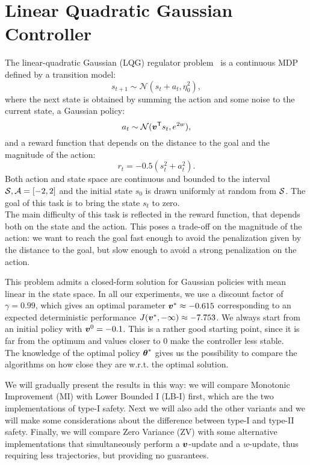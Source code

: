 \section{Linear Quadratic Gaussian Controller}\label{sec:lqg}

The linear-quadratic Gaussian (LQG) regulator problem~\cite{peters} is a continuous MDP defined by a transition model:
\[
s_{t+1}\sim \mathcal{N}(s_t + a_t, \eta_0^2),
\]
where the next state is obtained by summing the action and some noise to the current state, a Gaussian policy:
\[
a_t \sim \mathcal{N}({\boldsymbol{v}}^{\mathsf{T}}s_t, e^{2w}),
\]
and a reward function that depends on the distance to the goal and the magnitude of the action:
\[
r_t = -0.5(s_t^2 + a_t^2).
\]
Both action and state space are continuous and bounded to the interval $\mathcal{S}, \mathcal{A} = [-2, 2]$ and the initial state $s_0$ is drawn uniformly at random from $\mathcal{S}$. The goal of this task is to bring the state $s_t$ to zero. \\
The main difficulty of this task is reflected in the reward function, that depends both on the state and the action. This poses a trade-off on the magnitude of the action: we want to reach the goal fast enough to avoid the penalization given by the distance to the goal, but slow enough to avoid a strong penalization on the action. 

This problem admits a closed-form solution for Gaussian policies with mean linear in the state space. In all our experiments, we use a discount factor of $\gamma=0.99$, which gives an optimal parameter $\boldsymbol{v}^* \approx -0.615$ corresponding to an expected deterministic performance $J(\boldsymbol{v}^*, -\infty)\approx-7.753$. We always start from an initial policy with $\boldsymbol{v}^0=-0.1$. This is a rather good starting point, since it is far from the optimum   and values closer to 0 make the controller less stable. \\
The knowledge of the optimal policy ${\boldsymbol{\theta}}^*$ gives us the possibility to compare the algorithms on how close they are w.r.t. the optimal solution.

We will gradually present the results in this way: we will compare Monotonic Improvement (MI) with Lower Bounded I (LB-I) first, which are the two implementations of type-I safety. Next we will also add the other variants and we will make some considerations about the difference between type-I and type-II safety. Finally, we will compare Zero Variance (ZV) with some alternative implementations that simultaneously perform a $\boldsymbol{v}$-update and a $w$-update, thus requiring less trajectories, but providing no guarantees.

